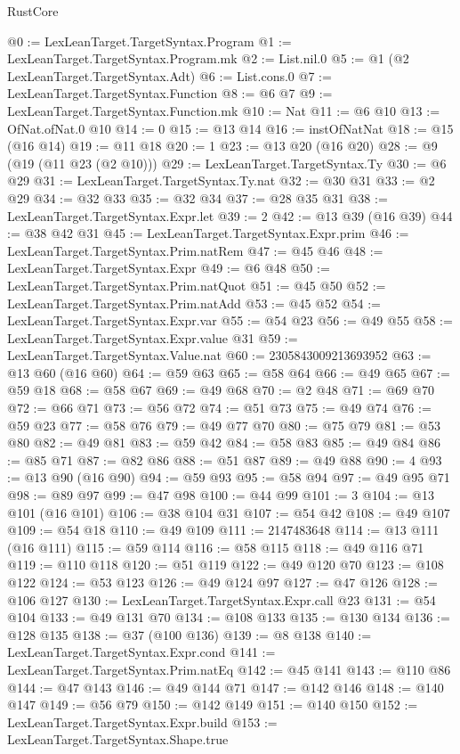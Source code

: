 \begin{lexlean}{RustCore}
\begin{coremodule}
@0 := LexLeanTarget.TargetSyntax.Program
@1 := LexLeanTarget.TargetSyntax.Program.mk
@2 := List.nil.{0}
@5 := @1 (@2 LexLeanTarget.TargetSyntax.Adt)
@6 := List.cons.{0}
@7 := LexLeanTarget.TargetSyntax.Function
@8 := @6 @7
@9 := LexLeanTarget.TargetSyntax.Function.mk
@10 := Nat
@11 := @6 @10
@13 := OfNat.ofNat.{0} @10
@14 := 0
@15 := @13 @14
@16 := instOfNatNat
@18 := @15 (@16 @14)
@19 := @11 @18
@20 := 1
@23 := @13 @20 (@16 @20)
@28 := @9 (@19 (@11 @23 (@2 @10)))
@29 := LexLeanTarget.TargetSyntax.Ty
@30 := @6 @29
@31 := LexLeanTarget.TargetSyntax.Ty.nat
@32 := @30 @31
@33 := @2 @29
@34 := @32 @33
@35 := @32 @34
@37 := @28 @35 @31
@38 := LexLeanTarget.TargetSyntax.Expr.let
@39 := 2
@42 := @13 @39 (@16 @39)
@44 := @38 @42 @31
@45 := LexLeanTarget.TargetSyntax.Expr.prim
@46 := LexLeanTarget.TargetSyntax.Prim.natRem
@47 := @45 @46
@48 := LexLeanTarget.TargetSyntax.Expr
@49 := @6 @48
@50 := LexLeanTarget.TargetSyntax.Prim.natQuot
@51 := @45 @50
@52 := LexLeanTarget.TargetSyntax.Prim.natAdd
@53 := @45 @52
@54 := LexLeanTarget.TargetSyntax.Expr.var
@55 := @54 @23
@56 := @49 @55
@58 := LexLeanTarget.TargetSyntax.Expr.value @31
@59 := LexLeanTarget.TargetSyntax.Value.nat
@60 := 2305843009213693952
@63 := @13 @60 (@16 @60)
@64 := @59 @63
@65 := @58 @64
@66 := @49 @65
@67 := @59 @18
@68 := @58 @67
@69 := @49 @68
@70 := @2 @48
@71 := @69 @70
@72 := @66 @71
@73 := @56 @72
@74 := @51 @73
@75 := @49 @74
@76 := @59 @23
@77 := @58 @76
@79 := @49 @77 @70
@80 := @75 @79
@81 := @53 @80
@82 := @49 @81
@83 := @59 @42
@84 := @58 @83
@85 := @49 @84
@86 := @85 @71
@87 := @82 @86
@88 := @51 @87
@89 := @49 @88
@90 := 4
@93 := @13 @90 (@16 @90)
@94 := @59 @93
@95 := @58 @94
@97 := @49 @95 @71
@98 := @89 @97
@99 := @47 @98
@100 := @44 @99
@101 := 3
@104 := @13 @101 (@16 @101)
@106 := @38 @104 @31
@107 := @54 @42
@108 := @49 @107
@109 := @54 @18
@110 := @49 @109
@111 := 2147483648
@114 := @13 @111 (@16 @111)
@115 := @59 @114
@116 := @58 @115
@118 := @49 @116 @71
@119 := @110 @118
@120 := @51 @119
@122 := @49 @120 @70
@123 := @108 @122
@124 := @53 @123
@126 := @49 @124 @97
@127 := @47 @126
@128 := @106 @127
@130 := LexLeanTarget.TargetSyntax.Expr.call @23
@131 := @54 @104
@133 := @49 @131 @70
@134 := @108 @133
@135 := @130 @134
@136 := @128 @135
@138 := @37 (@100 @136)
@139 := @8 @138
@140 := LexLeanTarget.TargetSyntax.Expr.cond
@141 := LexLeanTarget.TargetSyntax.Prim.natEq
@142 := @45 @141
@143 := @110 @86
@144 := @47 @143
@146 := @49 @144 @71
@147 := @142 @146
@148 := @140 @147
@149 := @56 @79
@150 := @142 @149
@151 := @140 @150
@152 := LexLeanTarget.TargetSyntax.Expr.build
@153 := LexLeanTarget.TargetSyntax.Shape.true

\end{coremodule}
\end{lexlean}
